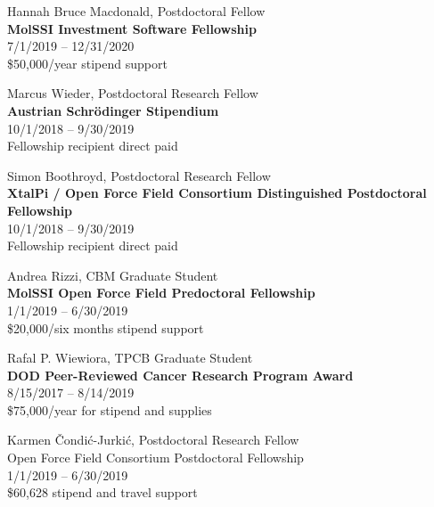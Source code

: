 \documentclass[10pt]{article}
\begin{document}
\vspace{1.5ex}

Hannah Bruce Macdonald, Postdoctoral Fellow\\
{\bf MolSSI Investment Software Fellowship}\\
7/1/2019 -- 12/31/2020\\
\$50,000/year stipend support

\vspace{1.5ex}

Marcus Wieder, Postdoctoral Research Fellow\\
{\bf Austrian Schr\"{o}dinger Stipendium}\\
10/1/2018 -- 9/30/2019\\
Fellowship recipient direct paid

\vspace{1.5ex}

Simon Boothroyd, Postdoctoral Research Fellow\\
{\bf XtalPi / Open Force Field Consortium Distinguished Postdoctoral Fellowship}\\
10/1/2018 -- 9/30/2019\\
Fellowship recipient direct paid

\vspace{1.5ex}

Andrea Rizzi, CBM Graduate Student\\
{\bf MolSSI Open Force Field Predoctoral Fellowship}\\
1/1/2019 -- 6/30/2019\\
\$20,000/six months stipend support

\vspace{1.5ex}

Rafal P. Wiewiora, TPCB Graduate Student\\
{\bf DOD Peer-Reviewed Cancer Research Program Award}\\
8/15/2017 -- 8/14/2019\\
 \$75,000/year for stipend and supplies

\vspace{1.5ex}

Karmen \v{C}ondi\'{c}-Jurki\'{c}, Postdoctoral Research Fellow\\
{Open Force Field Consortium Postdoctoral Fellowship}\\
1/1/2019 -- 6/30/2019\\
\$60,628 stipend and travel support

\vspace{1.5ex}
\end{document}
